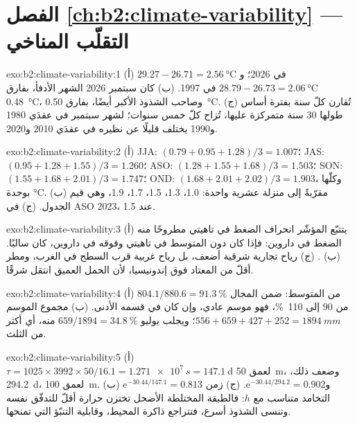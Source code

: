 \section*{الفصل \ref{ch:b2:climate-variability} --- التقلّب المناخي}

\begin{solution}{exo:b2:climate-variability:1}
(أ) $29.27 - 26.71 = \qty{2.56}{\celsius}$ في 2026؛ و$28.79 - 26.73 = \qty{2.06}{\celsius}$ في 1997.
(ب) كان سبتمبر 2026 الشهر الأدفأ، بفارق \qty{0.48}{\celsius}، وصاحب الشذوذ الأكبر أيضًا، بفارق
\qty{0.50}{\celsius}. (ج) تُقارن كلّ سنة بفترة أساس طولها 30 سنة متمركزة عليها، تُزاح
كلّ خمس سنوات؛  لشهر سبتمبر في عقدَي 1980 و1990 يختلف قليلًا عن نظيره في
عقدَي 2010 و2020.
\end{solution}

\begin{solution}{exo:b2:climate-variability:2}
(أ) JJA: $(0.79 + 0.95 + 1.28)/3 = 1.007$؛ JAS: $(0.95 + 1.28 + 1.55)/3 = 1.260$؛ ASO: $(1.28 +
1.55 + 1.68)/3 = 1.503$؛ SON: $(1.55 + 1.68 + 2.01)/3 = 1.747$؛ OND: $(1.68 + 2.01 + 2.02)/3 =
1.903$، وكلّها بوحدة \unit{\celsius}. (ب) مقرّبةً إلى منزلة عشرية واحدة: 1.0، 1.3، 1.5، 1.7، 1.9، وهي قيم
الجدول. (ج) في ASO 2023، عند 1.5.
\end{solution}

\begin{solution}{exo:b2:climate-variability:3}
(أ) يتتبّع المؤشّر انحراف الضغط في تاهيتي مطروحًا منه الضغط في داروين: فإذا كان دون المتوسط
في تاهيتي وفوقه في داروين، كان سالبًا. (ب) . (ج) رياح تجارية شرقية أضعف، بل
رياح غربية قرب السطح في الغرب، ومطر أقلّ من المعتاد فوق إندونيسيا، لأن
الحمل العميق انتقل شرقًا.
\end{solution}

\begin{solution}{exo:b2:climate-variability:4}
(أ) $804.1/880.6 = \qty{91.3}{\percent}$ من المتوسط: ضمن المجال من 90 إلى \qty{110}{\percent}، فهو
موسم عادي، وإن كان في قسمه الأدنى. (ب) مجموع الموسم $556 + 659 + 427 + 252 =
\qty{1894}{mm}$؛ ويجلب يوليو $659/1894 = \qty{34.8}{\percent}$ منه، أي أكثر من الثلث.
\end{solution}

\begin{solution}{exo:b2:climate-variability:5}
(أ) $\tau = 1025 \times 3992 \times 50/16.1 = \qty{1.271e7}{s} = \qty{147.1}{\day}$ لعمق
\qty{50}{m}، وضعف ذلك، \qty{294.2}{\day}، لعمق \qty{100}{m}. (ب) $\mathrm{e}^{-30.44/147.1} =
0.813$ و$\mathrm{e}^{-30.44/294.2} = 0.902$. (ج) زمن التخامد متناسب مع $h$: فالطبقة
المختلطة الأضحل تختزن حرارة أقلّ للتدفّق نفسه وتنسى الشذوذ أسرع، فتتراجع
ذاكرة المحيط، وقابلية التنبّؤ التي تمنحها.
\end{solution}

